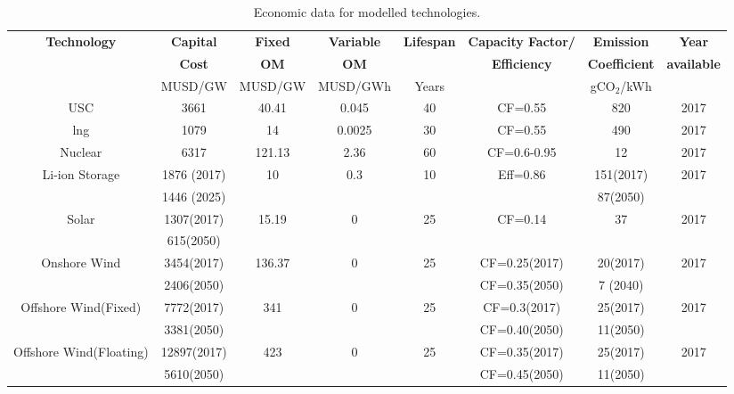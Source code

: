 \begin{landscape}
\begin{longtable}{ |*{8}{c|} }
\caption{Economic data for modelled technologies.}\\
\hline
\textbf{Technology} & \textbf{Capital} & \textbf{Fixed} & \textbf{Variable} & \textbf{Lifespan} & \textbf{Capacity Factor/} & \textbf{Emission} & \textbf{Year} \\
 & \textbf{Cost} & \textbf{\gls{OM}} & \textbf{\gls{OM}} &  & \textbf{Efficiency} & \textbf{Coefficient} & \textbf{available} \\
 & MUSD/GW & MUSD/GW & MUSD/GWh & Years  &  & gCO$_2$/kWh  &  \\
\hline
\endhead  %
\hline
\endfoot  %
\hline
\endlastfoot
\gls{USC} \cite{eia_cost_2020,ipcc_2014} & 3661 & 40.41 & 0.045 & 40 & CF=0.55 & 820 & 2017 \\
\gls{lng}\cite{eia_cost_2020,ipcc_2014} & 1079 & 14 & 0.0025 & 30 & CF=0.55 & 490 & 2017 \\
Nuclear \cite{eia_cost_2020,ipcc_2014,lokhov_load-following_2011} & 6317 & 121.13 & 2.36 & 60 & CF=0.6-0.95 & 12 & 2017 \\
Li-ion Storage \cite{mongird_energy_2019,emilsson_lithium-ion_2019} & 1876 (2017) & 10 & 0.3 & 10 & Eff=0.86 & 151(2017) & 2017 \\
 & 1446 (2025) &  &  &  &  & 87(2050) &  \\
Solar \cite{eia_cost_2020,ipcc_2014} & 1307(2017) & 15.19 & 0  & 25 & CF=0.14 & 37 & 2017 \\
 & 615(2050) & & & & & &  \\
Onshore Wind & 3454(2017) & 136.37 & 0 & 25 & CF=0.25(2017) & 20(2017) & 2017 \\
\cite{eia_cost_2020,ipcc_2014,kato_energy_2016,govindji_appraisal_2012,heger_wind_2016} & 2406(2050) &  &  &  & CF=0.35(2050) & 7 (2040) &  \\
Offshore Wind(Fixed) & 7772(2017) & 341 & 0 & 25 & CF=0.3(2017) & 25(2017) & 2017 \\
\cite{eia_cost_2020,ipcc_2014,kato_energy_2016,govindji_appraisal_2012,heger_wind_2016} & 3381(2050) &  &  & & CF=0.40(2050) & 11(2050) &  \\
Offshore Wind(Floating) & 12897(2017) & 423 & 0 & 25 & CF=0.35(2017) & 25(2017) & 2017 \\
\cite{eia_cost_2020,ipcc_2014,kato_energy_2016,govindji_appraisal_2012,heger_wind_2016} & 5610(2050) &  &  &  & CF=0.45(2050) & 11(2050) &  \\

\end{longtable}
\end{landscape}
